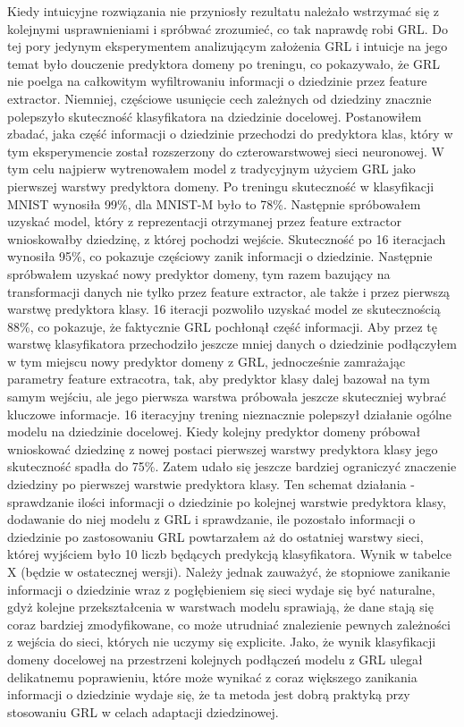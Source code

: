 \documentclass{article}
\begin{document}
\par
Kiedy intuicyjne rozwiązania nie przyniosły rezultatu należało wstrzymać się z kolejnymi usprawnieniami i spróbwać zrozumieć, co tak naprawdę robi GRL. Do tej pory jedynym eksperymentem analizującym założenia GRL i intuicje na jego temat było douczenie predyktora domeny po treningu, co pokazywało, że GRL nie poelga na całkowitym wyfiltrowaniu informacji o dziedzinie przez feature extractor. Niemniej, częściowe usunięcie cech zależnych od dziedziny znacznie polepszyło skuteczność klasyfikatora na dziedzinie docelowej. Postanowiłem zbadać, jaka część informacji o dziedzinie przechodzi do predyktora klas, który w tym eksperymencie został rozszerzony do czterowarstwowej sieci neuronowej. W tym celu najpierw wytrenowałem model z tradycyjnym użyciem GRL jako pierwszej warstwy predyktora domeny. Po treningu skuteczność w klasyfikacji MNIST wynosiła 99\%, dla MNIST-M było to 78\%. Następnie spróbowałem uzyskać model, który z reprezentacji otrzymanej przez feature extractor wnioskowałby dziedzinę, z której pochodzi wejście. Skuteczność po 16 iteracjach wynosiła 95\%, co pokazuje częściowy zanik informacji o dziedzinie. Następnie spróbwałem uzyskać nowy predyktor domeny, tym razem bazujący na transformacji danych nie tylko przez feature extractor, ale także i przez pierwszą warstwę predyktora klasy. 16 iteracji pozwoliło uzyskać model ze skutecznością 88\%, co pokazuje, że faktycznie GRL pochłonął część informacji. Aby przez tę warstwę klasyfikatora przechodziło jeszcze mniej danych o dziedzinie podłączyłem w tym miejscu nowy predyktor domeny z GRL, jednocześnie zamrażając parametry feature extracotra, tak, aby predyktor klasy dalej bazował na tym samym wejściu, ale jego pierwsza warstwa próbowała jeszcze skuteczniej wybrać kluczowe informacje. 16 iteracyjny trening nieznacznie polepszył działanie ogólne modelu na dziedzinie docelowej. Kiedy kolejny predyktor domeny próbował wnioskować dziedzinę z nowej postaci pierwszej warstwy predyktora klasy jego skuteczność spadła do 75\%. Zatem udało się jeszcze bardziej ograniczyć znaczenie dziedziny po pierwszej warstwie predyktora klasy. Ten schemat działania - sprawdzanie ilości informacji o dziedzinie po kolejnej warstwie predyktora klasy, dodawanie do niej modelu z GRL i sprawdzanie, ile pozostało informacji o dziedzinie po zastosowaniu GRL powtarzałem aż do ostatniej warstwy sieci, której wyjściem było 10 liczb będących predykcją klasyfikatora. Wynik w tabelce X (będzie w ostatecznej wersji). Należy jednak zauważyć, że stopniowe zanikanie informacji o dziedzinie wraz z pogłębieniem się sieci wydaje się być naturalne, gdyż kolejne przekształcenia w warstwach modelu sprawiają, że dane stają się coraz bardziej zmodyfikowane, co może utrudniać znalezienie pewnych zależności z wejścia do sieci, których nie uczymy się explicite. Jako, że wynik klasyfikacji domeny docelowej na przestrzeni kolejnych podłączeń modelu z GRL ulegał delikatnemu poprawieniu, które może wynikać z coraz większego zanikania informacji o dziedzinie wydaje się, że ta metoda jest dobrą praktyką przy stosowaniu GRL w celach adaptacji dziedzinowej.
\end{document}
